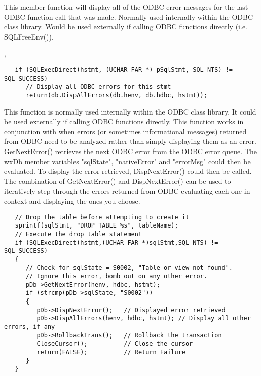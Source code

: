 
This member function will display all of the ODBC error messages for the last ODBC function call that was made.  Normally used internally within the ODBC class library.  Would be used externally if calling ODBC functions directly (i.e. SQLFreeEnv()).


, 

\begin{verbatim}
   if (SQLExecDirect(hstmt, (UCHAR FAR *) pSqlStmt, SQL_NTS) != SQL_SUCCESS)
      // Display all ODBC errors for this stmt
      return(db.DispAllErrors(db.henv, db.hdbc, hstmt));
\end{verbatim}


\label{wxdbdispnexterror}



This function is normally used internally within the ODBC class library.
It could be used externally if calling ODBC functions directly.  This
function works in conjunction with  when errors (or
sometimes informational messages)  returned from ODBC need to be analyzed
rather than simply displaying them as an error.  GetNextError() retrieves
the next ODBC error from the ODBC error queue.  The wxDb member variables
"sqlState", "nativeError" and "errorMsg" could then be evaluated.  To
display the error retrieved, DispNextError() could then be called.
The combination of GetNextError() and DispNextError() can be used to
iteratively step through the errors returned from ODBC evaluating each
one in context and displaying the ones you choose.

\begin{verbatim}
   // Drop the table before attempting to create it
   sprintf(sqlStmt, "DROP TABLE %s", tableName);
   // Execute the drop table statement
   if (SQLExecDirect(hstmt,(UCHAR FAR *)sqlStmt,SQL_NTS) != SQL_SUCCESS)
   {
      // Check for sqlState = S0002, "Table or view not found".
      // Ignore this error, bomb out on any other error.
      pDb->GetNextError(henv, hdbc, hstmt);
      if (strcmp(pDb->sqlState, "S0002"))
      {
         pDb->DispNextError();   // Displayed error retrieved
         pDb->DispAllErrors(henv, hdbc, hstmt); // Display all other errors, if any
         pDb->RollbackTrans();   // Rollback the transaction
         CloseCursor();          // Close the cursor
         return(FALSE);          // Return Failure
      }
   }
\end{verbatim}


